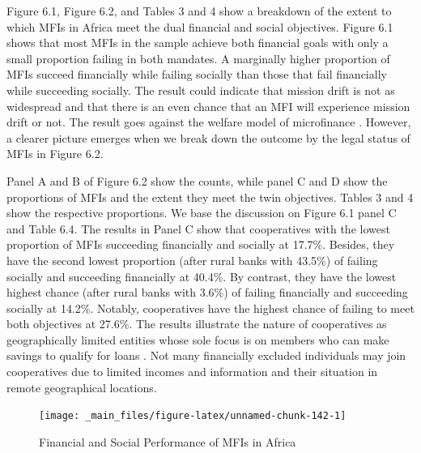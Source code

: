\documentclass[a4paper, nobind]{templates/ociamthesis}
\begin{document}
Figure 6.1, Figure 6.2, and Tables 3 and 4 show a breakdown of the extent to which MFIs in Africa meet the dual financial and social objectives. Figure 6.1 shows that most MFIs in the sample achieve both financial goals with only a small proportion failing in both mandates. A marginally higher proportion of MFIs succeed financially while failing socially than those that fail financially while succeeding socially. The result could indicate that mission drift is not as widespread and that there is an even chance that an MFI will experience mission drift or not. The result goes against the welfare model of microfinance \autocite{d2017ngos}. However, a clearer picture emerges when we break down the outcome by the legal status of MFIs in Figure 6.2.

Panel A and B of Figure 6.2 show the counts, while panel C and D show the proportions of MFIs and the extent they meet the twin objectives. Tables 3 and 4 show the respective proportions. We base the discussion on Figure 6.1 panel C and Table 6.4. The results in Panel C show that cooperatives with the lowest proportion of MFIs succeeding financially and socially at 17.7\%. Besides, they have the second lowest proportion (after rural banks with 43.5\%) of failing socially and succeeding financially at 40.4\%. By contrast, they have the lowest highest chance (after rural banks with 3.6\%) of failing financially and succeeding socially at 14.2\%. Notably, cooperatives have the highest chance of failing to meet both objectives at 27.6\%. The results illustrate the nature of cooperatives as geographically limited entities whose sole focus is on members who can make savings to qualify for loans \autocite{porter1987economic}. Not many financially excluded individuals may join cooperatives due to limited incomes and information and their situation in remote geographical locations.

\begin{figure}

{\centering \texttt{[image: \_main\_files/figure-latex/unnamed-chunk-142-1]} 

}

\caption{Financial and Social Performance of MFIs in Africa}\label{fig:unnamed-chunk-142}
\end{figure}
\end{document}
